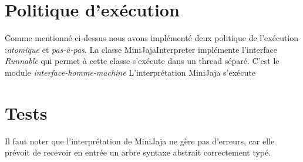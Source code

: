 \documentclass[a4paper,12pt]{article}
\begin{document}
\section{Politique d'exécution}  
Comme mentionné ci-dessus nous avons implémenté deux politique de l'exécution :\emph{atomique} et \emph{pas-à-pas}. La classe MiniJajaInterpreter implémente l'interface \emph{Runnable} qui permet à cette classe s'exécute  dans un thread séparé. C'est le module \emph{interface-homme-machine} 
L'interprétation MiniJaja s'exécute  
\section{Tests}
Il faut noter que l'interprétation de MiniJaja ne gère pas d'erreurs, car elle prévoit de recevoir en entrée un arbre syntaxe abstrait correctement typé. 
\end{document}
